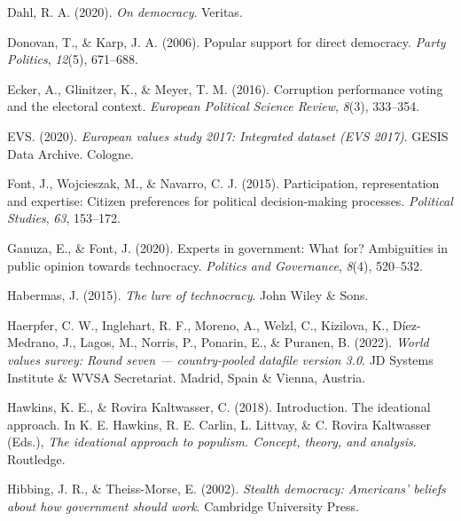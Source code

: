 \documentclass[
  12pt,
  english,
]{article}
\newlength{\cslhangindent}
\newlength{\cslentryspacingunit} %
\newenvironment{CSLReferences}[2] %
 {%
  \setlength{\parindent}{0pt}
  \ifodd #1
  \let\oldpar\par
  \def\par{\hangindent=\cslhangindent\oldpar}
  \fi
  \setlength{\parskip}{#2\cslentryspacingunit}
 }%
 {}
\begin{document}
\begin{CSLReferences}{1}{0}
\leavevmode{}%
Dahl, R. A. (2020). \emph{On democracy}. Veritas.

\leavevmode{}%
Donovan, T., \& Karp, J. A. (2006). Popular support for direct
democracy. \emph{Party Politics}, \emph{12}(5), 671--688.

\leavevmode{}%
Ecker, A., Glinitzer, K., \& Meyer, T. M. (2016). Corruption performance
voting and the electoral context. \emph{European Political Science
Review}, \emph{8}(3), 333--354.

\leavevmode{}%
EVS. (2020). \emph{European values study 2017: Integrated dataset (EVS
2017)}. GESIS Data Archive. Cologne.

\leavevmode{}%
Font, J., Wojcieszak, M., \& Navarro, C. J. (2015). Participation,
representation and expertise: Citizen preferences for political
decision-making processes. \emph{Political Studies}, \emph{63},
153--172.

\leavevmode{}%
Ganuza, E., \& Font, J. (2020). Experts in government: What for?
Ambiguities in public opinion towards technocracy. \emph{Politics and
Governance}, \emph{8}(4), 520--532.

\leavevmode{}%
Habermas, J. (2015). \emph{The lure of technocracy}. John Wiley \& Sons.

\leavevmode{}%
Haerpfer, C. W., Inglehart, R. F., Moreno, A., Welzl, C., Kizilova, K.,
Díez-Medrano, J., Lagos, M., Norris, P., Ponarin, E., \& Puranen, B.
(2022). \emph{World values survey: Round seven --- country-pooled
datafile version 3.0}. JD Systems Institute \& WVSA Secretariat. Madrid,
Spain \& Vienna, Austria.

\leavevmode{}%
Hawkins, K. E., \& Rovira Kaltwasser, C. (2018). Introduction. The
ideational approach. In K. E. Hawkins, R. E. Carlin, L. Littvay, \& C.
Rovira Kaltwasser (Eds.), \emph{The ideational approach to populism.
Concept, theory, and analysis}. Routledge.

\leavevmode{}%
Hibbing, J. R., \& Theiss-Morse, E. (2002). \emph{Stealth democracy:
Americans' beliefs about how government should work}. Cambridge
University Press.


\end{CSLReferences}
\end{document}
